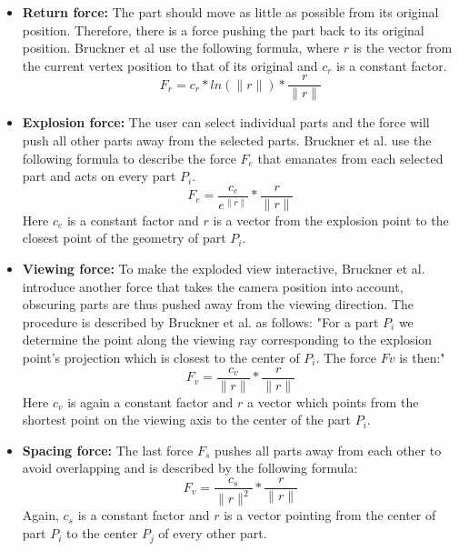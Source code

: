 \begin{itemize}
	\item \textbf{Return force:} The part should move as little as possible from its original position. Therefore, there is a force pushing the part back to its original position. Bruckner et al use the following formula, where $r$ is the vector from the current vertex position to that of its original and $c_r$ is a constant factor. 
	\begin{equation}
		F_r = c_r * ln(\|r\|) * \frac{r}{\|r\|}
		\label{eq:returnforce}
	\end{equation}
	
	\item \textbf{Explosion force:} The user can select individual parts and the force will push all other parts away from the selected parts. Bruckner et al. use the following formula to describe the force $F_e$ that emanates from each selected part and acts on every part $P_i$.
	\begin{equation}
		F_e = \frac{c_e}{e^{\|r\|}} * \frac{r}{\|r\|}
		\label{eq:explosionforce}
	\end{equation}
	Here $c_e$ is a constant factor and $r$ is a vector from the explosion point to the closest point of the geometry of part $P_i$.

	\item \textbf{Viewing force:} To make the exploded view interactive, Bruckner et al. introduce another force that takes the camera position into account, obscuring parts are thus pushed away from the viewing direction. The procedure is described by Bruckner et al. as follows: 
	"For a part $P_i$ we determine the point along the viewing ray corresponding to the explosion point’s projection which is closest to
	the center of $P_i$. The force $Fv$ is then:"
	\begin{equation}
		F_v = \frac{c_v}{\|r\|} * \frac{r}{\|r\|}
		\label{eq:viewingforce}
	\end{equation}
	Here $c_v$ is again a constant factor and $r$ a vector which points from the shortest point on the viewing axis to the center of the part $P_i$.  

	\item \textbf{Spacing force:} The last force $F_s$ pushes all parts away from each other to avoid overlapping and is described by the following formula:
	\begin{equation}
		F_v = \frac{c_s}{\|r\|^2} * \frac{r}{\|r\|}
		\label{eq:spacingforce}
	\end{equation}
	Again, $c_s$ is a constant factor and $r$ is a vector pointing from the center of part $P_i$ to the center $P_j$ of every other part.
\end{itemize}

